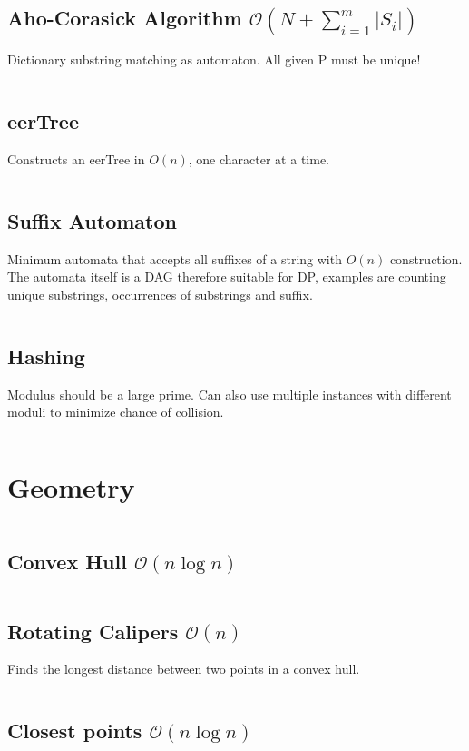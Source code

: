 \documentclass[8pt,a4paper,landscape,oneside]{amsart}
\newcommand{\mintedstyle}[2]{\inputminted[fontsize=\normalsize,baselinestretch=.9,breaklines,breakautoindent,tabsize=2]{#1}{code/#2}}
\newcommand{\code}[1]{\mintedstyle{cpp}{#1}}
\begin{document}
\begin{multicols*}{3}
\subsection{Aho-Corasick Algorithm $\mathcal{O}(N + \sum_{i=1}^{m} |S_i|)$}
Dictionary substring matching as automaton. All given P must be unique!
\code{strings/aho_corasick.cpp}

\subsection{eerTree}
Constructs an eerTree in $O(n)$, one character at a time.
\code{strings/eertree.cpp}

\subsection{Suffix Automaton}
Minimum automata that accepts all suffixes of a string with $O(n)$
construction. The automata itself is a DAG therefore suitable for DP,
examples are counting unique substrings, occurrences of substrings and
suffix.
\code{strings/suffix_automaton.cpp}

\subsection{Hashing}
Modulus should be a large prime. Can also use multiple instances with
different moduli to minimize chance of collision.
\code{strings/hasher.cpp}

\vfill\null \columnbreak
\section{Geometry}
\code{geometry/main.cpp}

\subsection{Convex Hull $\mathcal{O}(n \log n)$}
\code{geometry/convex_hull.cpp}

\subsection{Rotating Calipers $\mathcal{O}(n)$}
Finds the longest distance between two points in a convex hull.
\code{geometry/rotating_calipers.cpp}

\subsection{Closest points $\mathcal{O}(n \log n)$}
\code{geometry/closest_points.cpp}


\end{multicols*}
\end{document}
